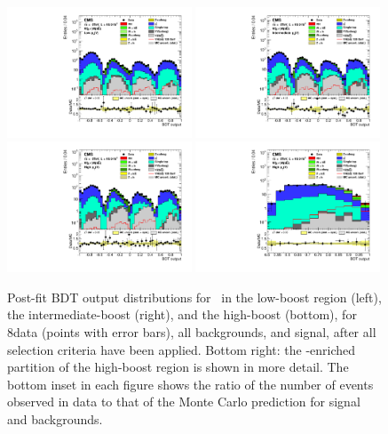\documentclass[11pt,twoside,a4paper,cmspaper,final,collab]{cms-tdr}
\begin{document}
\begin{figure}[htbp]
\centering
\includegraphics[width=0.49\textwidth]{BDT_Wln_ch2_Wmunu_PostFit_s.pdf}
\includegraphics[width=0.49\textwidth]{BDT_Wln_ch2_Wmunu2_PostFit_s.pdf}
\includegraphics[width=0.49\textwidth]{BDT_Wln_ch2_Wmunu3_PostFit_s.pdf}
\includegraphics[width=0.49\textwidth]{BDT_Wln_Last_ch2_Wmunu3_PostFit_s.pdf}
   \caption{Post-fit BDT output distributions for \WmnH\ in the
    low-boost region (left),  the intermediate-boost (right), and the
    high-boost  (bottom), for 8\TeV data (points with error bars),
    all backgrounds, and signal, after all selection criteria have been
    applied. Bottom right: the \VH-enriched partition of the high-boost region is
    shown in more detail. The bottom inset in each
      figure shows the ratio of the number of events observed in data to that
      of the Monte Carlo prediction for signal and backgrounds.}
    \label{fig:BDTWln8TeV_mu}
\end{figure}
\end{document}

